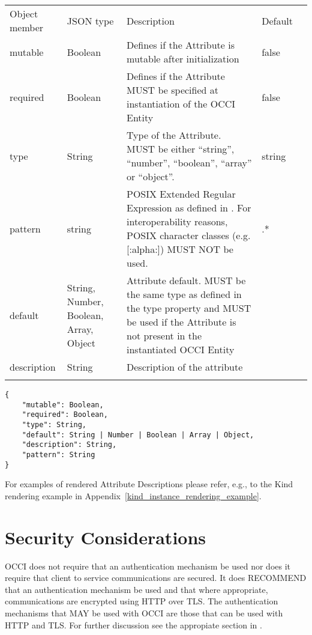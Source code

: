 \documentclass[10pt,a4paper]{article}
\begin{document}
 {
    \begin{tabularx}{\textwidth}{llXll}
    \toprule
    Object member & JSON type & Description & Default \\
    \colrule
    mutable & Boolean & Defines if the Attribute is mutable after initialization
& false \\

    required & Boolean & Defines if the Attribute MUST be specified at
instantiation of the OCCI Entity & false \\

    type & String & Type of the Attribute. MUST be either ``string'', ``number'',
``boolean'', ``array'' or ``object''. & string \\

    pattern & string & POSIX Extended Regular Expression as defined in
\cite{iso9945:2009}. For interoperability reasons, POSIX character classes
 (e.g. [:alpha:]) MUST NOT be used. & .* \\

    default & String, Number, Boolean, Array, Object & Attribute default. MUST be the same
type as defined in the type property and MUST  be used if the Attribute is not
present in the instantiated OCCI Entity & \\

    description & String & Description of the attribute & \\
    \botrule
    \end{tabularx}
}
\begin{lstlisting}
{
    "mutable": Boolean,
    "required": Boolean,
    "type": String,
    "default": String | Number | Boolean | Array | Object,
    "description": String,
    "pattern": String
}
\end{lstlisting}

For examples of rendered Attribute Descriptions please refer, e.g., to the Kind rendering example in Appendix~\ref{kind_instance_rendering_example}.

\section{Security Considerations}
OCCI does not require that an authentication mechanism be used nor
does it require that client to service communications are secured. It
does RECOMMEND that an authentication mechanism be used and that where
appropriate, communications are encrypted using HTTP over TLS. The
authentication mechanisms that MAY be used with OCCI are those that
can be used with HTTP and TLS. For further discussion see the
appropiate section in \cite{occi:protocol}.
\end{document}
